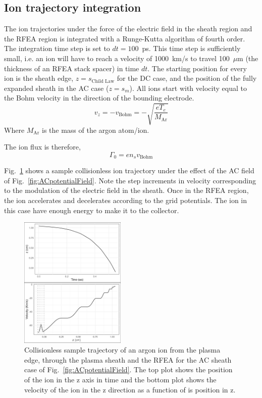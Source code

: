 \subsection{\label{IonTrajectory}Ion trajectory integration}
The ion trajectories under the force of the electric field in the sheath region and the RFEA region is integrated with a Runge-Kutta algorithm of fourth order. The integration time step is set to $dt=100$~ps. This time step is sufficiently small, i.e. an ion will have to reach a velocity of 1000~km/s to travel 100~$\mu$m (the thickness of an RFEA stack spacer) in time $dt$. The starting position for every ion is the sheath edge, $z=s_\text{Child Law}$ for the DC case, and the position of the fully expanded sheath in the AC case ($z=s_m$). All ions start with velocity equal to the Bohm velocity in the direction of the bounding electrode.
\begin{equation}
v_z = - v_\text{Bohm} = -\sqrt{\frac{e T_e}{M_\text{Ar}}}
\end{equation}
Where $M_\text{Ar}$ is the mass of the argon atom/ion. 

The ion flux is therefore, 
\begin{equation}
\Gamma_0 = e n_s v_\text{Bohm} 
\end{equation}

Fig.~\ref{fig:CollisionlessACtrajectory} shows a sample collisionless ion trajectory under the effect of the AC field of Fig.~\ref{fig:ACpotentialField}. Note the step increments in velocity corresponding to the modulation of the electric field in the sheath. Once in the RFEA region, the ion accelerates and decelerates according to the grid potentials. The ion in this case have enough energy to make it to the collector. 

\begin{figure}[htbp]
\centering
\includegraphics[width=0.45\textwidth]{Figures/ionTrajectory2Pa13.56MHz2kVStack2332_Collisionless.jpeg}
\caption{Collisionless sample trajectory of an argon ion from the plasma edge, through the plasma sheath and the RFEA for the AC sheath case of Fig.~\ref{fig:ACpotentialField}. The top plot shows the position of the ion in the z axis in time and the bottom plot shows the velocity of the ion in the z direction as a function of is position in z. }
\label{fig:CollisionlessACtrajectory}
\end{figure}



